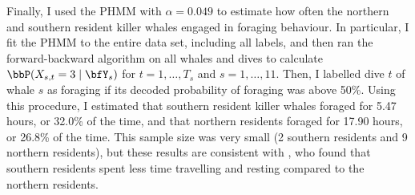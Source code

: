 
Finally, I used the PHMM with $\alpha = 0.049$ to estimate how often the northern and southern resident killer whales engaged in foraging behaviour. In particular, I fit the PHMM to the entire data set, including all labels, and then ran the forward-backward algorithm on all whales and dives to calculate $\bbP(X_{s,t} = 3 \mid \bfY_s)$ for $t = 1,\ldots,T_s$ and $s = 1,\ldots,11$. Then, I labelled dive $t$ of whale $s$ as foraging if its decoded probability of foraging was above 50\%. Using this procedure, I estimated that southern resident killer whales foraged for 5.47 hours, or 32.0\% of the time, and that northern residents foraged for 17.90 hours, or 26.8\% of the time. This sample size was very small (2 southern residents and 9 northern residents), but these results are consistent with \citet{Tennessen:2023}, who found that southern residents spent less time travelling and resting compared to the northern residents.
